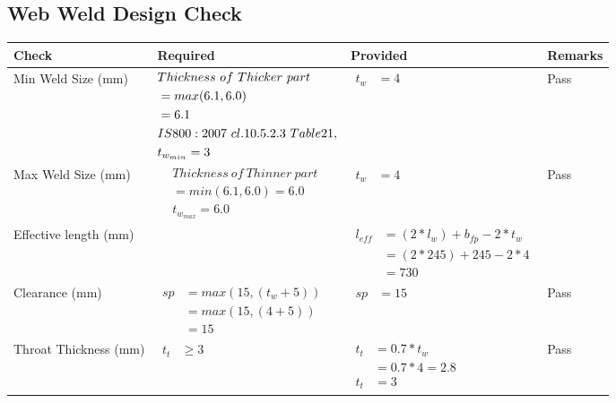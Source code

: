 \documentclass{article}%
\begin{document}
\subsection{Web Weld  Design Check }%
\label{subsec:WebWeldDesignCheck}%
\renewcommand{\arraystretch}{1.2}%
\begin{longtable}{|p{3.5cm}|p{6cm}|p{6cm}|p{1.5cm}|}%
\hline%
\rowcolor{OsdagGreen}%
Check&Required&Provided&Remarks\\%
\hline%
\endhead%
\hline%
Min Weld Size (mm)&$\begin{aligned} &Thickness~of~Thicker~part\\ \noindent &=max(6.1,6.0)\\ &=6.1\\ &IS800:2007~cl.10.5.2.3~Table 21,\\  &t_{w_{min}}=3\end{aligned}$&$\begin{aligned} t_w &=4\end{aligned}$&Pass\\%
\hline%
Max Weld Size (mm)&$\begin{aligned} & Thickness~of~Thinner~part\\ &=min(6.1,6.0)=6.0\\ &t_{w_{max}} =6.0\end{aligned}$&$\begin{aligned} t_w &=4\end{aligned}$&Pass\\%
\hline%
Effective length (mm)&&$\begin{aligned} l_{eff} &= (2*l_w) + b_{fp} - 2*t_w\\ &= (2*245) +245 - 2*4\\ & = 730\end{aligned}$&\\%
\hline%
Clearance (mm)&$\begin{aligned} sp &= max(15,(t_w+5))\\ &= max(15,(4+5))\\ &=15\end{aligned}$&$\begin{aligned} sp &=15\end{aligned}$&Pass\\%
\hline%
Throat Thickness (mm)&$\begin{aligned} t_t &\geq 3 \end{aligned}$&$\begin{aligned} t_t & = 0.7* t_w \\ & = 0.7*4=2.8\\ t_t & = 3\end{aligned}$&Pass\\%

\end{longtable}
\end{document}
